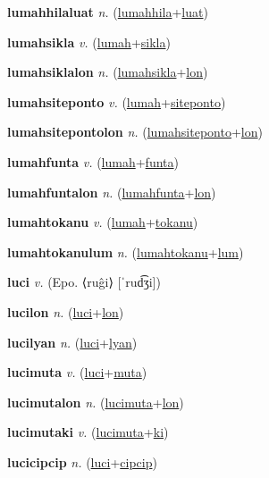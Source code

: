 \textbf{\hypertarget{lumahhilaluat}{lumahhilaluat}} \textit{n.} (\hyperlink{lumahhila}{lumahhila}+\allowbreak \hyperlink{luat}{luat})


\textbf{\hypertarget{lumahsikla}{lumahsikla}} \textit{v.} (\hyperlink{lumah}{lumah}+\allowbreak \hyperlink{sikla}{sikla})


\textbf{\hypertarget{lumahsiklalon}{lumahsiklalon}} \textit{n.} (\hyperlink{lumahsikla}{lumahsikla}+\allowbreak \hyperlink{lon}{lon})


\textbf{\hypertarget{lumahsiteponto}{lumahsiteponto}} \textit{v.} (\hyperlink{lumah}{lumah}+\allowbreak \hyperlink{siteponto}{siteponto})


\textbf{\hypertarget{lumahsitepontolon}{lumahsitepontolon}} \textit{n.} (\hyperlink{lumahsiteponto}{lumahsiteponto}+\allowbreak \hyperlink{lon}{lon})


\textbf{\hypertarget{lumahfunta}{lumahfunta}} \textit{v.} (\hyperlink{lumah}{lumah}+\allowbreak \hyperlink{funta}{funta})


\textbf{\hypertarget{lumahfuntalon}{lumahfuntalon}} \textit{n.} (\hyperlink{lumahfunta}{lumahfunta}+\allowbreak \hyperlink{lon}{lon})


\textbf{\hypertarget{lumahtokanu}{lumahtokanu}} \textit{v.} (\hyperlink{lumah}{lumah}+\allowbreak \hyperlink{tokanu}{tokanu})


\textbf{\hypertarget{lumahtokanulum}{lumahtokanulum}} \textit{n.} (\hyperlink{lumahtokanu}{lumahtokanu}+\allowbreak \hyperlink{lum}{lum})


\textbf{\hypertarget{luci}{luci}} \textit{v.} (Epo. ⟨ruĝi⟩ [ˈrud͡ʒi])


\textbf{\hypertarget{lucilon}{lucilon}} \textit{n.} (\hyperlink{luci}{luci}+\allowbreak \hyperlink{lon}{lon})


\textbf{\hypertarget{lucilyan}{lucilyan}} \textit{n.} (\hyperlink{luci}{luci}+\allowbreak \hyperlink{lyan}{lyan})


\textbf{\hypertarget{lucimuta}{lucimuta}} \textit{v.} (\hyperlink{luci}{luci}+\allowbreak \hyperlink{muta}{muta})


\textbf{\hypertarget{lucimutalon}{lucimutalon}} \textit{n.} (\hyperlink{lucimuta}{lucimuta}+\allowbreak \hyperlink{lon}{lon})


\textbf{\hypertarget{lucimutaki}{lucimutaki}} \textit{v.} (\hyperlink{lucimuta}{lucimuta}+\allowbreak \hyperlink{ki}{ki})


\textbf{\hypertarget{lucicipcip}{lucicipcip}} \textit{n.} (\hyperlink{luci}{luci}+\allowbreak \hyperlink{cipcip}{cipcip})


